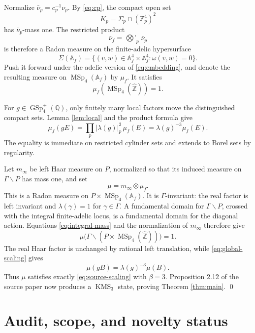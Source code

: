 \documentclass[11pt]{article}
\newcommand{\Afinite}{\mathbb A_f}
\newcommand{\Zhat}{\widehat{\mathbb Z}}
\newcommand{\Zp}{\mathbb Z_p}
\newcommand{\GSp}{\operatorname{GSp}_4}
\newcommand{\MSp}{\operatorname{MSp}_4}
\newcommand{\KMS}{\operatorname{KMS}}
\begin{document}
Normalize $\bar\nu_p=c_p^{-1}\nu_p$.  By \eqref{eq:cp}, the compact open set
\[
 K_p=\Sigma_p\cap(\Zp^4)^2
\]
has $\bar\nu_p$-mass one.  The restricted product
\[
  \bar\nu_f=\mathop{\bigotimes\!'}_p\bar\nu_p
\]
is therefore a Radon measure on the finite-adelic hypersurface
\[
  \Sigma(\Afinite)=
  \{(v,w)\in\Afinite^4\times\Afinite^4:\omega(v,w)=0\}.
\]
Push it forward under the adelic version of \eqref{eq:embedding}, and denote
the resulting measure on $\MSp(\Afinite)$ by $\mu_f$.  It satisfies
\begin{equation}\label{eq:integral-mass}
  \mu_f(\MSp(\Zhat))=1.
\end{equation}

For $g\in\GSp^+(\mathbb Q)$, only finitely many local factors move the
distinguished compact sets.  Lemma \ref{lem:local} and the product formula give
\begin{equation}\label{eq:global-scaling}
  \mu_f(gE)
   =\prod_p|\lambda(g)|_p^3\,\mu_f(E)
   =\lambda(g)^{-3}\mu_f(E).
\end{equation}
The equality is immediate on restricted cylinder sets and extends to Borel
sets by regularity.

Let $m_\infty$ be left Haar measure on $P$, normalized so that its induced
measure on $\Gamma\backslash P$ has mass one, and set
\[
  \mu=m_\infty\otimes\mu_f.
\]
This is a Radon measure on $P\times\MSp(\Afinite)$.  It is
$\Gamma$-invariant: the real factor is left invariant and
$\lambda(\gamma)=1$ for $\gamma\in\Gamma$.  A fundamental domain for
$\Gamma\backslash P$, crossed with the integral finite-adelic locus, is a
fundamental domain for the diagonal action.  Equations
\eqref{eq:integral-mass} and the normalization of $m_\infty$ therefore give
\[
  \mu\bigl(\Gamma\backslash(P\times\MSp(\Zhat))\bigr)=1.
\]
The real Haar factor is unchanged by rational left translation, while
\eqref{eq:global-scaling} gives
\[
  \mu(gB)=\lambda(g)^{-3}\mu(B).
\]
Thus $\mu$ satisfies exactly \eqref{eq:source-scaling} with $\beta=3$.
Proposition 2.12 of the source paper now produces a $\KMS_3$ state, proving
Theorem \ref{thm:main}. \qed

\section{Audit, scope, and novelty status}
\end{document}
